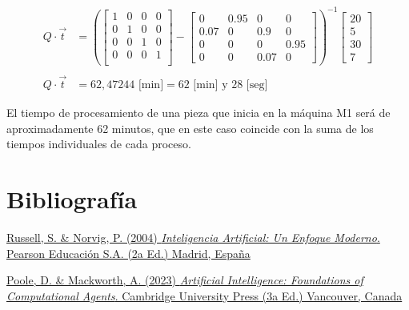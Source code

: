 \documentclass[11pt]{article}
\begin{document}
\begin{align*}

Q \cdot \vec{t} & = \left(\begin{bmatrix}
1 & 0 & 0 & 0 \\
0 & 1 & 0 & 0 \\
0 & 0 & 1 & 0 \\
0 & 0 & 0 & 1 \\
\end{bmatrix} - \begin{bmatrix}
0 & 0.95 & 0 & 0 \\ 0.07 & 0 & 0.9 & 0 \\ 0 & 0 & 0 & 0.95 \\ 0 & 0 & 0.07 & 0
\end{bmatrix}\right)^{-1} \begin{bmatrix} 20 \\ 5 \\ 30 \\ 7 \end{bmatrix}
\\
\\
Q \cdot \vec{t} & = 62,47244 \text{ [min]} = 62 \text{ [min] y } 28 \text{ [seg]}
\end{align*}


El tiempo de procesamiento de una pieza que inicia en la máquina M1 será de aproximadamente 62 minutos, que en este caso coincide con la suma de los tiempos individuales de cada proceso.

    \hypertarget{bibliografuxeda}{%
\section{Bibliografía}\label{bibliografuxeda}}

\href{https://www.academia.edu/8241613/Inteligencia_Aritificial_Un_Enfoque_Moderno_2da_Edici\%C3\%B3n_Stuart_J_Russell_y_Peter_Norvig}{Russell,
S. \& Norvig, P. (2004) \emph{Inteligencia Artificial: Un Enfoque
Moderno}. Pearson Educación S.A. (2a Ed.) Madrid, España}

\href{https://artint.info/3e/html/ArtInt3e.html}{Poole, D. \& Mackworth,
A. (2023) \emph{Artificial Intelligence: Foundations of Computational
Agents}. Cambridge University Press (3a Ed.) Vancouver, Canada}


    
    
    
\end{document}
